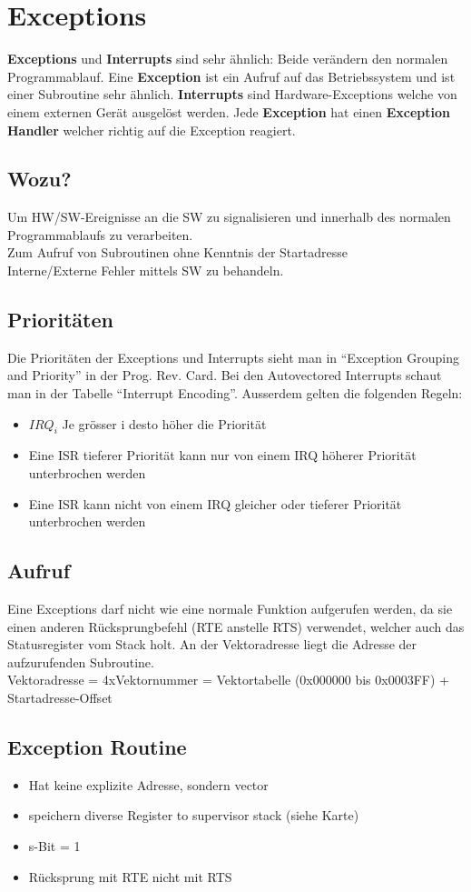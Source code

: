 \section{Exceptions}
\textbf{Exceptions} und \textbf{Interrupts} sind sehr ähnlich: Beide verändern den normalen Programmablauf.
Eine \textbf{Exception} ist ein Aufruf auf das Betriebssystem und ist einer Subroutine sehr ähnlich. 
\textbf{Interrupts} sind Hardware-Exceptions welche von einem externen Gerät ausgelöst werden.
Jede \textbf{Exception} hat einen \textbf{Exception Handler} welcher richtig auf die Exception reagiert.
\subsection{Wozu?}
Um HW/SW-Ereignisse an die SW zu signalisieren und innerhalb des normalen
Programmablaufs zu verarbeiten.\\
Zum Aufruf von Subroutinen ohne Kenntnis der Startadresse\\
Interne/Externe Fehler mittels SW zu behandeln.
\subsection{Prioritäten}
Die Prioritäten der Exceptions und Interrupts sieht man in ``Exception Grouping and Priority'' in
der Prog. Rev. Card. Bei den Autovectored Interrupts schaut man in der Tabelle ``Interrupt
Encoding''. Ausserdem gelten die folgenden Regeln:
\begin{itemize}
	\item $IRQ_i$ Je grösser i desto höher die Priorität
	\item Eine ISR tieferer Priorität kann nur von einem IRQ höherer Priorität unterbrochen werden
	\item Eine ISR kann nicht von einem IRQ gleicher oder tieferer Priorität unterbrochen werden
\end{itemize}
\subsection{Aufruf}
Eine Exceptions darf nicht wie eine normale Funktion aufgerufen werden, da sie einen anderen
Rücksprungbefehl (RTE anstelle RTS) verwendet, welcher auch das Statusregister vom Stack holt.
An der Vektoradresse liegt die Adresse der aufzurufenden Subroutine.\\
Vektoradresse = 4xVektornummer = Vektortabelle (0x000000 bis 0x0003FF) +
Startadresse-Offset
\subsection{Exception Routine}
\begin{itemize}
  \item Hat keine explizite Adresse, sondern vector
  \item speichern diverse Register to supervisor stack (siehe Karte)
  \item s-Bit = 1
  \item Rücksprung mit RTE nicht mit RTS
\end{itemize}

